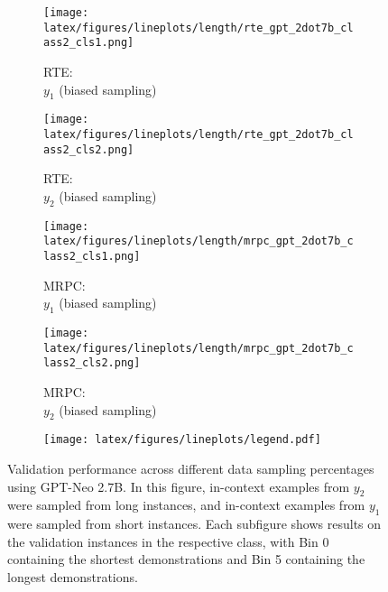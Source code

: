 \begin{figure}[t!]
    \centering
    \begin{minipage}[t]{\linewidth}
        \begin{subfigure}{0.49\linewidth}
            \centering
            \texttt{[image: latex/figures/lineplots/length/rte\_gpt\_2dot7b\_class2\_cls1.png]}
            \caption{RTE: \\ $y_1$ (biased sampling)}\label{fig:image1}
        \end{subfigure}%
        \hfill
        \begin{subfigure}{0.49\linewidth}
            \centering
            \texttt{[image: latex/figures/lineplots/length/rte\_gpt\_2dot7b\_class2\_cls2.png]}
            \caption{RTE: \\ $y_2$ (biased sampling)}\label{fig:image2}
        \end{subfigure}
        \hfill
        \begin{subfigure}{0.49\linewidth}
            \centering
            \texttt{[image: latex/figures/lineplots/length/mrpc\_gpt\_2dot7b\_class2\_cls1.png]}
            \caption{MRPC: \\ $y_1$ (biased sampling)}\label{fig:image3}
        \end{subfigure}
        \hfill
        \begin{subfigure}{0.49\linewidth}
            \centering
            \texttt{[image: latex/figures/lineplots/length/mrpc\_gpt\_2dot7b\_class2\_cls2.png]}
            \caption{MRPC: \\ $y_2$ (biased sampling)}\label{fig:image4}
        \end{subfigure}%
    \end{minipage}%
    \hfill
    \begin{minipage}[c]{\linewidth}
        \centering
        \vspace{2mm}
            \begin{subfigure}{0.7 \linewidth}
            \centering
            \texttt{[image: latex/figures/lineplots/legend.pdf]}
        \end{subfigure}%
    \end{minipage}
    \hfill
    \begin{minipage}[c]{\linewidth}
        \caption{\label{fig:len} Validation performance across different data sampling percentages using GPT-Neo 2.7B. In this figure, in-context examples from $y_2$ were sampled from long instances, and in-context examples from $y_1$ were sampled from short instances. Each subfigure shows results on the validation instances in the respective class, with Bin 0 containing the shortest demonstrations and Bin 5 containing the longest demonstrations. }
    \end{minipage}
\end{figure}